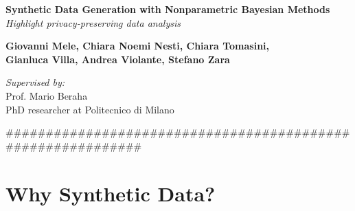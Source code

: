 \documentclass{beamer}
\begin{document}
\begin{frame}

    \begin{center}
    \bigskip
        {\Huge \bfseries Synthetic Data Generation with Nonparametric Bayesian Methods}\\[0.5cm]
        {\Large \itshape Highlight privacy-preserving data analysis}\\[1cm]
    \end{center}

    \begin{flushleft}
        \textbf{Giovanni Mele, Chiara Noemi Nesti, Chiara Tomasini,\\Gianluca Villa, Andrea Violante, Stefano Zara}
    \end{flushleft}

    \begin{flushright}
        \textit{Supervised by:}\\
        Prof. Mario Beraha\\
        PhD researcher at Politecnico di Milano
    \end{flushright}
    
\end{frame}

############################################################

\section{Why Synthetic Data?}
\end{document}
